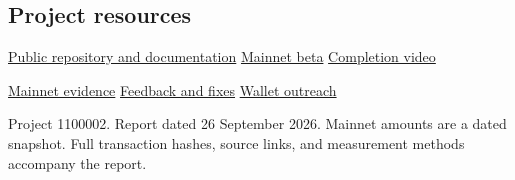 \documentclass[fontsize=10pt,paper=a4,DIV=16,parskip=half-]{scrartcl}
\newcommand{\repo}[2]{\href{https://github.com/schaier-io/epora-wallet/blob/main/#1}{#2}}
\begin{document}
\subsection*{Project resources}
\href{https://github.com/schaier-io/epora-wallet}{Public repository and documentation}\quad
\href{https://mainnet.epora.io}{Mainnet beta}\quad
\href{https://youtu.be/XKyZoa02kag}{Completion video}

\repo{docs/closeout/mainnet-evidence.md}{Mainnet evidence}\quad
\repo{docs/testnet-feedback.md}{Feedback and fixes}\quad
\repo{docs/wallet-integration.md}{Wallet outreach}

\vfill
{\footnotesize\color{brandnavy!75}Project 1100002. Report dated 26 September 2026. Mainnet amounts are a dated snapshot. Full transaction hashes, source links, and measurement methods accompany the report.}
\end{document}
